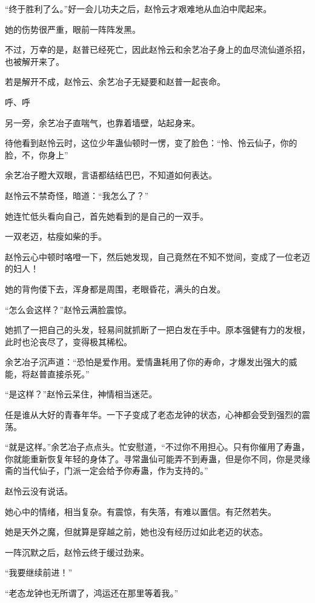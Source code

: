 
\begin{this_body}

“终于胜利了么。”好一会儿功夫之后，赵怜云才艰难地从血泊中爬起来。

她的伤势很严重，眼前一阵阵发黑。

不过，万幸的是，赵普已经死亡，因此赵怜云和余艺冶子身上的血尽流仙道杀招，也被解开来了。

若是解开不成，赵怜云、余艺冶子无疑要和赵普一起丧命。

呼、呼

另一旁，余艺冶子直喘气，也靠着墙壁，站起身来。

待他看到赵怜云时，这位少年蛊仙顿时一愣，变了脸色：“怜、怜云仙子，你的脸，不，你身上”

余艺冶子瞪大双眼，言语都结结巴巴，不知道如何表达。

赵怜云不禁奇怪，暗道：“我怎么了？”

她连忙低头看向自己，首先她看到的是自己的一双手。

一双老迈，枯瘦如柴的手。

赵怜云心中顿时咯噔一下，然后她发现，自己竟然在不知不觉间，变成了一位老迈的妇人！

她的背佝偻下去，浑身都是周围，老眼昏花，满头的白发。

“怎么会这样？”赵怜云满脸震惊。

她抓了一把自己的头发，轻易间就抓断了一把白发在手中。原本强健有力的发根，此时也沦丧尽了，变得极其稀松。

余艺冶子沉声道：“恐怕是爱作用。爱情蛊耗用了你的寿命，才爆发出强大的威能，将赵普直接杀死。”

“是这样？”赵怜云呆住，神情相当迷茫。

任是谁从大好的青春年华。一下子变成了老态龙钟的状态，心神都会受到强烈的震荡。

“就是这样。”余艺冶子点点头。忙安慰道，“不过你不用担心。只有你催用了寿蛊，你就能重新恢复年轻的身体了。寻常蛊仙可能弄不到寿蛊，但是你不同，你是灵缘斋的当代仙子，门派一定会给予你寿蛊，作为支持的。”

赵怜云没有说话。

她心中的情绪，相当复杂。有震惊，有失落，有难以置信。有茫然若失。

她是天外之魔，但就算是穿越之前，她也没有经历过如此老迈的状态。

一阵沉默之后，赵怜云终于缓过劲来。

“我要继续前进！”

“老态龙钟也无所谓了，鸿运还在那里等着我。”


\end{this_body}
